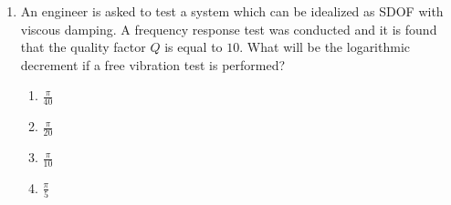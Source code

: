 \documentclass[journal,onecolumn]{IEEEtran}
\theoremstyle{remark}
\begin{document}
\begin{enumerate}
	\item An engineer is asked to test a system which can be idealized as SDOF  with viscous damping. A frequency response test was conducted and it is found that the quality factor $Q$ is equal to $10$. What will be the logarithmic decrement if a free vibration test is performed?
	\hfill{}
	\begin{enumerate}
		\item $\frac{\pi}{40}$
		\item $\frac{\pi}{20}$
		\item $\frac{\pi}{10}$
		\item $\frac{\pi}{5}$
	\end{enumerate}

\end{enumerate}
\end{document}
